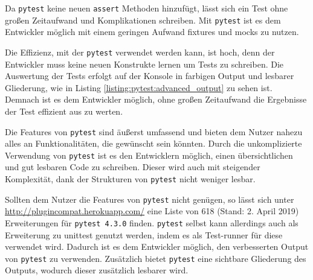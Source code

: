 Da \lstinline{pytest} keine neuen \lstinline{assert} Methoden hinzufügt, lässt
sich ein Test ohne großen Zeitaufwand und Komplikationen schreiben. Mit
\lstinline{pytest} ist es dem Entwickler möglich mit einem geringen Aufwand
\Glspl{fixture} und \Glspl{mock} zu nutzen.

Die Effizienz, mit der \lstinline{pytest} verwendet werden kann, ist hoch, denn
der Entwickler muss keine neuen Konstrukte lernen um Tests zu schreiben. Die
Auswertung der Tests erfolgt auf der Konsole in farbigen Output und lesbarer
Gliederung, wie in Listing \ref{listing:pytest:advanced_output} zu sehen ist.
Demnach ist es dem Entwickler möglich, ohne großen Zeitaufwand die Ergebnisse
der Test effizient aus zu werten.

Die Features von \lstinline{pytest} sind äußerst umfassend und bieten dem Nutzer
nahezu alles an Funktionalitäten, die gewünscht sein könnten. Durch die
unkomplizierte Verwendung von \lstinline{pytest} ist es den Entwicklern möglich,
einen übersichtlichen und gut lesbaren Code zu schreiben. Dieser wird auch mit
steigender Komplexität, dank der Strukturen von \lstinline{pytest} nicht weniger
lesbar.

Sollten dem Nutzer die Features von \lstinline{pytest} nicht genügen, so lässt
sich unter \url{http://plugincompat.herokuapp.com/} eine Liste von 618 (Stand:
2. April 2019) Erweiterungen für \lstinline{pytest 4.3.0} finden.
\lstinline{pytest} selbst kann allerdings auch als Erweiterung zu unittest
genutzt werden, indem es als Test-runner für diese verwendet wird. Dadurch ist
es dem Entwickler möglich, den verbesserten Output von \lstinline{pytest} zu
verwenden. Zusätzlich bietet \lstinline{pytest} eine sichtbare Gliederung des
Outputs, wodurch dieser zusätzlich lesbarer wird.